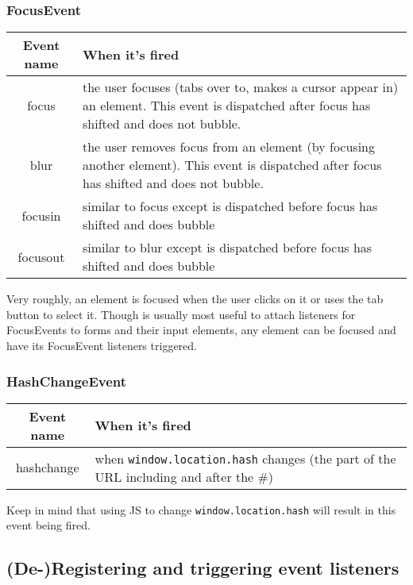 \documentclass[12pt]{article}
\begin{document}
\subsubsection*{FocusEvent}
\begin{center}
  \begin{tabular}{| c | p{10.4cm} |}
    \hline
    \textbf{Event name} & \textbf{When it's fired} \\
    \hline
    focus & the user focuses (tabs over to, makes a cursor
            appear in) an element. This event is dispatched after focus has shifted and does not bubble. \\
    \hline
    blur & the user removes focus from an element (by
           focusing another element). This event is dispatched after focus has shifted and does not bubble.\\
    \hline
    focusin & similar to focus except is dispatched before
              focus has shifted and does bubble \\
    \hline
    focusout & similar to blur except is dispatched before
               focus has shifted and does bubble \\
    \hline
  \end{tabular}
\end{center}
Very roughly, an element is focused when the user clicks on it or uses the tab button to select it. Though is usually most useful to attach listeners for FocusEvents to forms and their input elements, any element can be focused and have its FocusEvent listeners triggered. 
\subsubsection*{HashChangeEvent}
\begin{center}
  \begin{tabular}{| c | p{10.4cm} |}
    \hline
    \textbf{Event name} & \textbf{When it's fired} \\
    \hline
    hashchange & when \texttt{window.location.hash} changes (the part
                 of the URL including and after the \#)  \\
    \hline
  \end{tabular}
\end{center}
Keep in mind that using JS to change \texttt{window.location.hash} will result in this event being fired.



\subsection{(De-)Registering and triggering event listeners}
\end{document}
